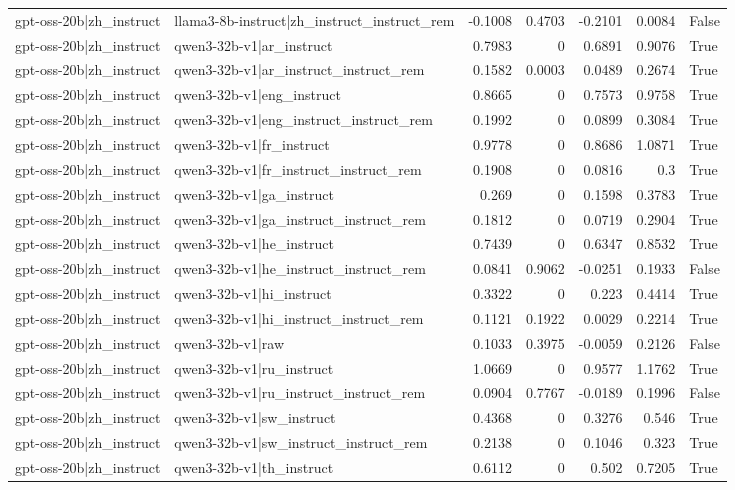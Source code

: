 \begin{table}
\begin{tabular}{l l r r r r l}
gpt-oss-20b|zh_instruct & llama3-8b-instruct|zh_instruct_instruct_rem & -0.1008 & 0.4703 & -0.2101 & 0.0084 & False \\
gpt-oss-20b|zh_instruct & qwen3-32b-v1|ar_instruct & 0.7983 & 0 & 0.6891 & 0.9076 & True \\
gpt-oss-20b|zh_instruct & qwen3-32b-v1|ar_instruct_instruct_rem & 0.1582 & 0.0003 & 0.0489 & 0.2674 & True \\
gpt-oss-20b|zh_instruct & qwen3-32b-v1|eng_instruct & 0.8665 & 0 & 0.7573 & 0.9758 & True \\
gpt-oss-20b|zh_instruct & qwen3-32b-v1|eng_instruct_instruct_rem & 0.1992 & 0 & 0.0899 & 0.3084 & True \\
gpt-oss-20b|zh_instruct & qwen3-32b-v1|fr_instruct & 0.9778 & 0 & 0.8686 & 1.0871 & True \\
gpt-oss-20b|zh_instruct & qwen3-32b-v1|fr_instruct_instruct_rem & 0.1908 & 0 & 0.0816 & 0.3 & True \\
gpt-oss-20b|zh_instruct & qwen3-32b-v1|ga_instruct & 0.269 & 0 & 0.1598 & 0.3783 & True \\
gpt-oss-20b|zh_instruct & qwen3-32b-v1|ga_instruct_instruct_rem & 0.1812 & 0 & 0.0719 & 0.2904 & True \\
gpt-oss-20b|zh_instruct & qwen3-32b-v1|he_instruct & 0.7439 & 0 & 0.6347 & 0.8532 & True \\
gpt-oss-20b|zh_instruct & qwen3-32b-v1|he_instruct_instruct_rem & 0.0841 & 0.9062 & -0.0251 & 0.1933 & False \\
gpt-oss-20b|zh_instruct & qwen3-32b-v1|hi_instruct & 0.3322 & 0 & 0.223 & 0.4414 & True \\
gpt-oss-20b|zh_instruct & qwen3-32b-v1|hi_instruct_instruct_rem & 0.1121 & 0.1922 & 0.0029 & 0.2214 & True \\
gpt-oss-20b|zh_instruct & qwen3-32b-v1|raw & 0.1033 & 0.3975 & -0.0059 & 0.2126 & False \\
gpt-oss-20b|zh_instruct & qwen3-32b-v1|ru_instruct & 1.0669 & 0 & 0.9577 & 1.1762 & True \\
gpt-oss-20b|zh_instruct & qwen3-32b-v1|ru_instruct_instruct_rem & 0.0904 & 0.7767 & -0.0189 & 0.1996 & False \\
gpt-oss-20b|zh_instruct & qwen3-32b-v1|sw_instruct & 0.4368 & 0 & 0.3276 & 0.546 & True \\
gpt-oss-20b|zh_instruct & qwen3-32b-v1|sw_instruct_instruct_rem & 0.2138 & 0 & 0.1046 & 0.323 & True \\
gpt-oss-20b|zh_instruct & qwen3-32b-v1|th_instruct & 0.6112 & 0 & 0.502 & 0.7205 & True \\

\end{tabular}
\end{table}
